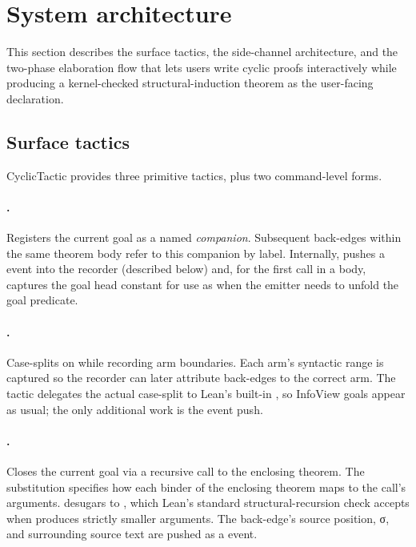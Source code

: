\section{System architecture}
\label{sec:architecture}

This section describes the surface tactics, the side-channel architecture,
and the two-phase elaboration flow that lets users write cyclic proofs
interactively while producing a kernel-checked structural-induction theorem
as the user-facing declaration.

\subsection{Surface tactics}

CyclicTactic provides three primitive tactics, plus two command-level
forms.

\paragraph{.}
Registers the current goal as a named \emph{companion}. Subsequent
back-edges within the same theorem body refer to this companion by label.
Internally,  pushes a  event into the
recorder (described below) and, for the first  call in a body,
captures the goal head constant for use as  when the
emitter needs to unfold the goal predicate.

\paragraph{.}
Case-splits on  while recording arm boundaries. Each arm's
syntactic range is captured so the recorder can later attribute back-edges
to the correct arm. The tactic delegates the actual case-split to Lean's
built-in , so InfoView goals appear as usual; the only
additional work is the event push.

\paragraph{.}
Closes the current goal via a recursive call to the enclosing theorem. The
 substitution specifies how each binder of the enclosing theorem
maps to the call's arguments.  desugars to
, which Lean's standard structural-recursion check
accepts when  produces strictly smaller arguments. The
back-edge's source position, σ, and surrounding source text are pushed as a
 event.

